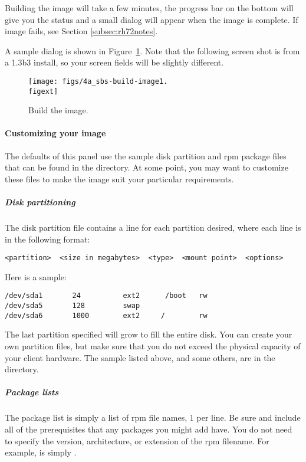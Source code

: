 Building the image will take a few minutes, the progress bar on the bottom 
will give you the status and a small dialog will appear when the image
is complete.  If image fails, see Section \ref{subsec:rh72notes}.
  
A sample dialog is shown in Figure~\ref{fig:detailed-build-image}. \begchange Note that the following screen shot is from a 1.3b3 install, so your screen fields will be slightly different.   
\endchange
\begin{figure}[htbp]
  \begin{center}
    \texttt{[image: figs/4a\_sbs-build-image1.\\figext]}
    \caption{Build the image.}
    \label{fig:detailed-build-image}
  \end{center}
\end{figure}
  
\paragraph{Customizing your image}

The defaults of this panel use the sample disk partition and rpm package files
that can be found in the  directory.
At some point, you may want to customize these files to make the image
suit your particular requirements.

\subparagraph{Disk partitioning}

The disk partition file contains a line for each partition desired, where
each line is in the following format:

\begin{verbatim}
<partition>  <size in megabytes>  <type>  <mount point>  <options>
\end{verbatim}

Here is a sample:

\begin{verbatim}
/dev/sda1       24          ext2      /boot   rw
/dev/sda5       128         swap
/dev/sda6       1000        ext2     /        rw
\end{verbatim}

The last partition specified will grow to fill the entire disk.
You can create your own partition files, but make sure that you
do not exceed the physical capacity of your client hardware. The sample
listed above, and some others, are in the  directory.

\subparagraph{Package lists}
The package list is simply a list of rpm file names, 1
per line. Be sure and include all of the prerequisites that
any packages you might add have. \begchange You do not need to specify
the version, architecture, or extension of the rpm filename. For example,  is simply . \endchange

